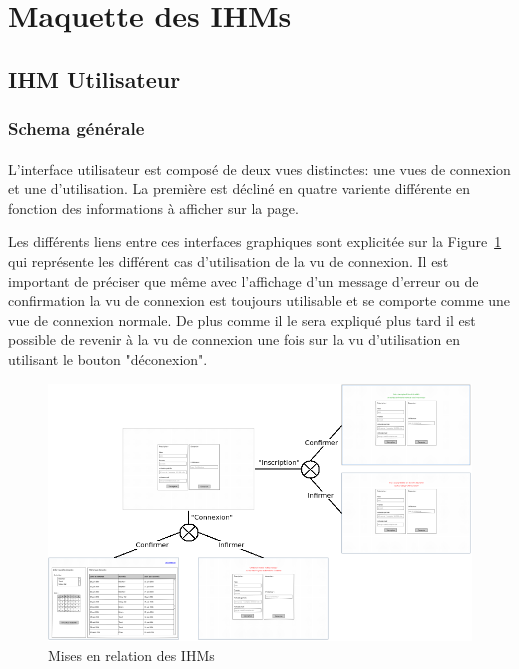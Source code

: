 \documentclass[a4paper,11pt]{article}
\begin{document}
\pagebreak
\section{Maquette des IHMs}

\subsection{IHM Utilisateur}

\subsubsection{Schema générale}

\paragraph{}
L'interface utilisateur est composé de deux vues distinctes: une vues de connexion et une d'utilisation. La première est décliné en quatre variente différente en fonction des informations à afficher sur la page.

Les différents liens entre ces interfaces graphiques sont explicitée sur la Figure~\ref{IHMs} qui représente les différent cas d'utilisation de la vu de connexion. Il est important de préciser que même avec l'affichage d'un message d'erreur ou de confirmation la vu de connexion est toujours utilisable et se comporte comme une vue de connexion normale. De plus comme il le sera expliqué plus tard il est possible de revenir à la vu de connexion une fois sur la vu d'utilisation en utilisant le bouton "déconexion".

\begin{figure}[H]
  \begin{center}
    \includegraphics[width=15cm]{../../IHM/graphique_IHM.png}
    \caption{Mises en relation des IHMs}
    \label{IHMs}
  \end{center}
\end{figure}
\pagebreak
\end{document}
